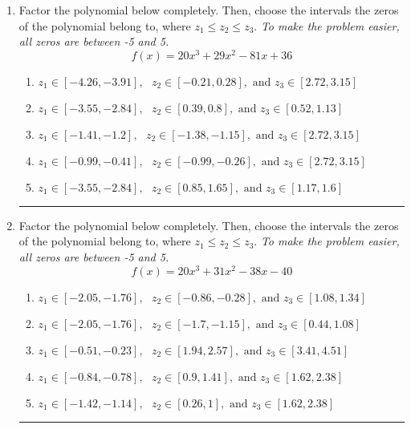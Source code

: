 \documentclass[14pt]{extbook}
\newcommand{\litem}[1]{\item#1\hspace*{-1cm}\rule{\textwidth}{0.4pt}}
\begin{document}
\begin{enumerate}
{\begin{enumerate}[label=\Alph*.]
\end{enumerate} }
\litem{
Factor the polynomial below completely. Then, choose the intervals the zeros of the polynomial belong to, where $z_1 \leq z_2 \leq z_3$. \textit{To make the problem easier, all zeros are between -5 and 5.}\[ f(x) = 20x^{3} +29 x^{2} -81 x + 36 \]\begin{enumerate}[label=\Alph*.]
\item \( z_1 \in [-4.26, -3.91], \text{   }  z_2 \in [-0.21, 0.28], \text{   and   } z_3 \in [2.72, 3.15] \)
\item \( z_1 \in [-3.55, -2.84], \text{   }  z_2 \in [0.39, 0.8], \text{   and   } z_3 \in [0.52, 1.13] \)
\item \( z_1 \in [-1.41, -1.2], \text{   }  z_2 \in [-1.38, -1.15], \text{   and   } z_3 \in [2.72, 3.15] \)
\item \( z_1 \in [-0.99, -0.41], \text{   }  z_2 \in [-0.99, -0.26], \text{   and   } z_3 \in [2.72, 3.15] \)
\item \( z_1 \in [-3.55, -2.84], \text{   }  z_2 \in [0.85, 1.65], \text{   and   } z_3 \in [1.17, 1.6] \)

\end{enumerate} }
\litem{
Factor the polynomial below completely. Then, choose the intervals the zeros of the polynomial belong to, where $z_1 \leq z_2 \leq z_3$. \textit{To make the problem easier, all zeros are between -5 and 5.}\[ f(x) = 20x^{3} +31 x^{2} -38 x -40 \]\begin{enumerate}[label=\Alph*.]
\item \( z_1 \in [-2.05, -1.76], \text{   }  z_2 \in [-0.86, -0.28], \text{   and   } z_3 \in [1.08, 1.34] \)
\item \( z_1 \in [-2.05, -1.76], \text{   }  z_2 \in [-1.7, -1.15], \text{   and   } z_3 \in [0.44, 1.08] \)
\item \( z_1 \in [-0.51, -0.23], \text{   }  z_2 \in [1.94, 2.57], \text{   and   } z_3 \in [3.41, 4.51] \)
\item \( z_1 \in [-0.84, -0.78], \text{   }  z_2 \in [0.9, 1.41], \text{   and   } z_3 \in [1.62, 2.38] \)
\item \( z_1 \in [-1.42, -1.14], \text{   }  z_2 \in [0.26, 1], \text{   and   } z_3 \in [1.62, 2.38] \)


\end{enumerate}}
\end{enumerate}
\end{document}
